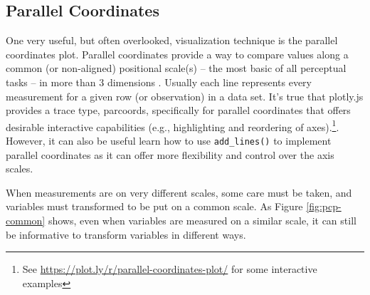 \documentclass[
  12pt,
]{krantz}
\newenvironment{Shaded}{\begin{snugshade}}{\end{snugshade}}
\newcommand{\ControlFlowTok}[1]{\textcolor[rgb]{0.13,0.29,0.53}{\textbf{#1}}}
\newcommand{\DataTypeTok}[1]{\textcolor[rgb]{0.13,0.29,0.53}{#1}}
\newcommand{\DecValTok}[1]{\textcolor[rgb]{0.00,0.00,0.81}{#1}}
\newcommand{\FloatTok}[1]{\textcolor[rgb]{0.00,0.00,0.81}{#1}}
\newcommand{\KeywordTok}[1]{\textcolor[rgb]{0.13,0.29,0.53}{\textbf{#1}}}
\newcommand{\NormalTok}[1]{#1}
\newcommand{\OperatorTok}[1]{\textcolor[rgb]{0.81,0.36,0.00}{\textbf{#1}}}
\newcommand{\OtherTok}[1]{\textcolor[rgb]{0.56,0.35,0.01}{#1}}
\newcommand{\StringTok}[1]{\textcolor[rgb]{0.31,0.60,0.02}{#1}}
\begin{document}
\hypertarget{parallel-coordinates}{%
\subsection{Parallel Coordinates}\label{parallel-coordinates}}


One very useful, but often overlooked, visualization technique is the parallel coordinates plot. Parallel coordinates provide a way to compare values along a common (or non-aligned) positional scale(s) -- the most basic of all perceptual tasks -- in more than 3 dimensions \citep{graphical-perception}. Usually each line represents every measurement for a given row (or observation) in a data set. It's true that plotly.js provides a trace type, parcoords, specifically for parallel coordinates that offers desirable interactive capabilities (e.g., highlighting and reordering of axes).\footnote{See \url{https://plot.ly/r/parallel-coordinates-plot/} for some interactive examples}. However, it can also be useful learn how to use \texttt{add\_lines()} to implement parallel coordinates as it can offer more flexibility and control over the axis scales.

When measurements are on very different scales, some care must be taken, and variables must transformed to be put on a common scale. As Figure \ref{fig:pcp-common} shows, even when variables are measured on a similar scale, it can still be informative to transform variables in different ways.

\begin{Shaded}
\end{Shaded}
\end{document}
